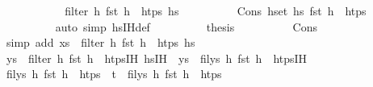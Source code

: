 \begin{isabellebody}
\ \ \ \ \ \ \isamarkupfalse%
\ \isamarkupfalse%
\ {\isachardoublequoteopen}{\isachardot}{\kern0pt}{\isachardot}{\kern0pt}{\isachardot}{\kern0pt}\ {\isacharequal}{\kern0pt}\ filter\ {\isacharparenleft}{\kern0pt}{\isasymlambda}h{\isachardot}{\kern0pt}\ fst\ h\ {\isasymin}\ htps{\isacharparenright}{\kern0pt}\ hs{}{\isachardoublequoteclose}\isanewline
\ \ \ \ \ \ \ \ \isamarkupfalse%
\ Cons\ {\isacartoucheopen}{\isacharparenleft}{\kern0pt}{\isasymforall}h{\isasymin}set\ hs{}{\isachardot}{\kern0pt}\ fst\ h\ {\isasymnotin}\ htps{\isacharparenright}{\kern0pt}{\isacartoucheclose}\isanewline
\ \ \ \ \ \ \ \ \isamarkupfalse%
\ {\isacharparenleft}{\kern0pt}auto\ simp{\isacharcolon}{\kern0pt}\ hs{\isacharunderscore}{\kern0pt}IH{\isacharunderscore}{\kern0pt}def{\isacharparenright}{\kern0pt}\isanewline
\ \ \ \ \ \ \isamarkupfalse%
\ \isamarkupfalse%
\ {\isacharquery}{\kern0pt}thesis\isanewline
\ \ \ \ \ \ \ \ \isamarkupfalse%
\ Cons\isanewline
\ \ \ \ \ \ \ \ \isamarkupfalse%
\ {\isacharparenleft}{\kern0pt}simp\ add{\isacharcolon}{\kern0pt}\ {\isacartoucheopen}xs\ {\isacharequal}{\kern0pt}\ filter\ {\isacharparenleft}{\kern0pt}{\isasymlambda}h{\isachardot}{\kern0pt}\ fst\ h\ {\isasymin}\ htps{\isacharparenright}{\kern0pt}\ hs{}{\isacartoucheclose}{\isacharparenright}{\kern0pt}\isanewline
\ \ \ \ \isamarkupfalse%
\isanewline
\ \ \ \ \isamarkupfalse%
\ \isamarkupfalse%
\ {\isachardoublequoteopen}ys\ {\isacharequal}{\kern0pt}\ filter\ {\isacharparenleft}{\kern0pt}{\isasymlambda}h{\isachardot}{\kern0pt}\ fst\ h\ {\isasymin}\ htps{\isacharunderscore}{\kern0pt}IH{\isacharparenright}{\kern0pt}\ {\isacharparenleft}{\kern0pt}hs{\isacharprime}{\kern0pt}{\isacharunderscore}{\kern0pt}IH{\isacharparenright}{\kern0pt}{\isachardoublequoteclose}\ {\isacharparenleft}{\kern0pt}\ {\isachardoublequoteopen}{\isacharquery}{\kern0pt}ys\ {\isacharequal}{\kern0pt}\ {\isacharquery}{\kern0pt}fil{\isacharunderscore}{\kern0pt}ys\ {\isacharparenleft}{\kern0pt}{\isasymlambda}h{\isachardot}{\kern0pt}\ fst\ h\ {\isasymin}\ htps{\isacharunderscore}{\kern0pt}IH{\isacharparenright}{\kern0pt}{\isachardoublequoteclose}{\isacharparenright}{\kern0pt}\isanewline
\ \ \ \ \isamarkupfalse%
{\isacharminus}{\kern0pt}\isanewline
\ \ \ \ \ \ \isamarkupfalse%
\ {\isachardoublequoteopen}{\isacharquery}{\kern0pt}fil{\isacharunderscore}{\kern0pt}ys\ {\isacharparenleft}{\kern0pt}{\isasymlambda}h{\isachardot}{\kern0pt}\ fst\ h\ {\isasymin}\ htps\ {\isacharminus}{\kern0pt}\ {\isacharbraceleft}{\kern0pt}t{\isacharprime}{\kern0pt}{\isacharbraceright}{\kern0pt}{\isacharparenright}{\kern0pt}\ {\isacharequal}{\kern0pt}\ {\isacharquery}{\kern0pt}fil{\isacharunderscore}{\kern0pt}ys\ {\isacharparenleft}{\kern0pt}{\isasymlambda}h{\isachardot}{\kern0pt}\ fst\ h\ {\isasymin}\ htps{\isacharparenright}{\kern0pt}{\isachardoublequoteclose}\isanewline

\end{isabellebody}

